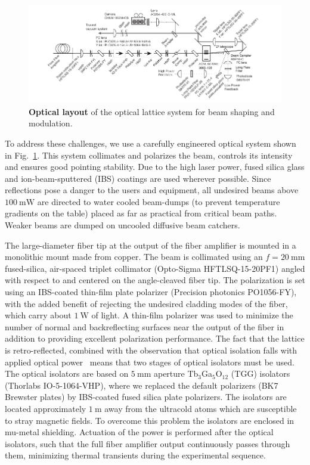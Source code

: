 \documentclass[twocolumn,aip,rsi,reprint,bibnotes]{revtex4-1}
\newcommand\unit[2]{\ensuremath{#1~\mathrm{{#2}}}}
\begin{document}
\begin{figure}[t]
  \begin{center}
    \includegraphics{Figure3.pdf}
    \caption{\textbf{Optical layout} of the optical lattice system for beam shaping and modulation.}\label{fig:optical_layout}
  \end{center}
\end{figure}

To address these challenges, we use a carefully engineered optical system shown in Fig.~\ref{fig:optical_layout}.
This system collimates and polarizes the beam, controls its intensity and ensures good pointing stability.
Due to the high laser power, fused silica glass and ion-beam-sputtered (IBS) coatings are used wherever possible.
Since reflections pose a danger to the users and equipment, all undesired beams above \unit{100}{mW} are directed to water cooled beam-dumps (to prevent temperature gradients on the table) placed as far as practical from critical beam paths.
Weaker beams are dumped on uncooled diffusive beam catchers.

The large-diameter fiber tip at the output of the fiber amplifier is mounted in a monolithic mount made from copper.
The beam is collimated using an $f=\unit{20}{mm}$ fused-silica, air-spaced triplet collimator (Opto-Sigma HFTLSQ-15-20PF1) angled with respect to and centered on the angle-cleaved fiber tip.
The polarization is set using an IBS-coated thin-film plate polarizer (Precision photonics PO1056-FY), with the added benefit of rejecting the undesired cladding modes of the fiber, which carry about \unit{1}{W} of light. A thin-film polarizer was used to minimize the number of normal and backreflecting surfaces near the output of the fiber in addition to providing excellent polarization performance.
The fact that the lattice is retro-reflected, combined with the observation that optical isolation falls with applied optical power~\cite{Yoshida1999} means that two stages of optical isolators must be used.
The optical isolators are based on \unit{5}{mm} aperture Tb$_3$Ga$_5$O$_{12}$ (TGG) isolators (Thorlabs IO-5-1064-VHP), where we replaced the default polarizers (BK7 Brewster plates) by IBS-coated fused silica plate polarizers.
The isolators are located approximately \unit{1}{m} away from the ultracold atoms which are susceptible to stray magnetic fields.
To overcome this problem the isolators are enclosed in mu-metal shielding.
Actuation of the power is performed after the optical isolators, such that the full fiber amplifier output continuously passes through them, minimizing thermal transients during the experimental sequence.
\end{document}
